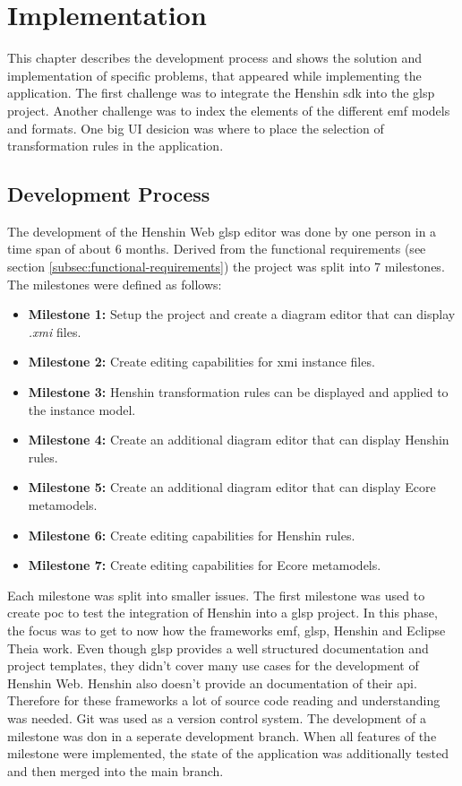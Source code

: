 \chapter{Implementation}
  \label{subsec:implementation}
  This chapter describes the development process and shows the solution and implementation of specific problems, that appeared while implementing the application. The first challenge was to integrate the Henshin \acs{sdk} into the \ac{glsp} project. Another challenge was to index the elements of the different \ac{emf} models and formats. One big UI desicion was where to place the selection of transformation rules in the application.

  \section{Development Process}
  \label{subsec:development-process}
  The development of the Henshin Web \ac{glsp} editor was done by one person in a time span of about 6 months. Derived from the functional requirements (see section \ref{subsec:functional-requirements}) the project was split into 7 milestones. The milestones were defined as follows:
  \begin{itemize}
    \item \textbf{Milestone 1:} Setup the project and create a diagram editor that can display \textit{.xmi} files.
    \item \textbf{Milestone 2:} Create editing capabilities for \ac{xmi} instance files.
    \item \textbf{Milestone 3:} Henshin transformation rules can be displayed and applied to the instance model.
    \item \textbf{Milestone 4:} Create an additional diagram editor that can display Henshin rules.
    \item \textbf{Milestone 5:} Create an additional diagram editor that can display Ecore metamodels.
    \item \textbf{Milestone 6:} Create editing capabilities for Henshin rules.
    \item \textbf{Milestone 7:} Create editing capabilities for Ecore metamodels.
  \end{itemize}

  Each milestone was split into smaller issues. The first milestone was used to create \ac{poc} to test the integration of Henshin into a \ac{glsp} project. In this phase, the focus was to get to now how the frameworks \ac{emf}, \ac{glsp}, Henshin and Eclipse Theia work. Even though \ac{glsp} provides a well structured documentation and project templates, they didn't cover many use cases for the development of Henshin Web. Henshin also doesn't provide an documentation of their \acs{api}. Therefore for these frameworks a lot of source code reading and understanding was needed. 
  Git was used as a version control system. The development of a milestone was don in a seperate development branch. When all features of the milestone were implemented, the state of the application was additionally tested and then merged into the main branch.


